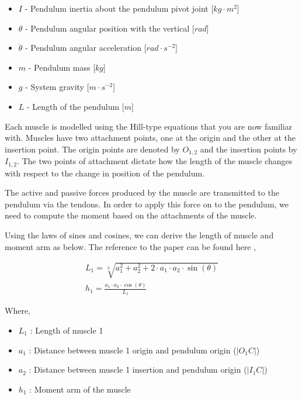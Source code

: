 \documentclass{cmc}
\begin{document}
\begin{itemize}
\item $I$ - Pendulum inertia about the pendulum pivot joint
  [$kg \cdot m^2$]
\item $\theta$ - Pendulum angular position with the vertical [$rad$]
\item $\ddot{\theta}$ - Pendulum angular acceleration
  [$rad \cdot s^{-2}$]
\item $m$ - Pendulum mass [$kg$]
\item $g$ - System gravity [$m \cdot s^{-2}$]
\item $L$ - Length of the pendulum [$m$]
\end{itemize}

Each muscle is modelled using the Hill-type equations that you are now
familiar with.  Muscles have two attachment points, one at the origin
and the other at the insertion point.  The origin points are denoted
by $O_{1,2}$ and the insertion points by $I_{1,2}$. The two points of
attachment dictate how the length of the muscle changes with respect
to the change in position of the pendulum.

The active and passive forces produced by the muscle are transmitted
to the pendulum via the tendons. In order to apply this force on to
the pendulum, we need to compute the moment based on the attachments
of the muscle.

Using the laws of sines and cosines, we can derive the length of
muscle and moment arm as below. The reference to the paper can be
found here
\href{https://www.ncbi.nlm.nih.gov/pmc/articles/PMC5323435}{},

\begin{eqnarray}
  \label{eq:2_lab6}
  L_1 = \sqrt[2]{a_{1}^2 + a_{2}^2 + 2 \cdot a_1 \cdot a_2 \cdot \sin(\theta)} \\
  h_1 = \frac{a_1 \cdot a_2 \cdot \cos(\theta)}{L_1}
\end{eqnarray}

Where,

\begin{itemize}
\item $L_1$ : Length of muscle 1
\item $a_1$ : Distance between muscle 1 origin and pendulum origin
  ($|O_1C|$)
\item $a_2$ : Distance between muscle 1 insertion and pendulum origin
  ($|I_1C|$)
\item $h_1$ : Moment arm of the muscle
\end{itemize}
\end{document}

